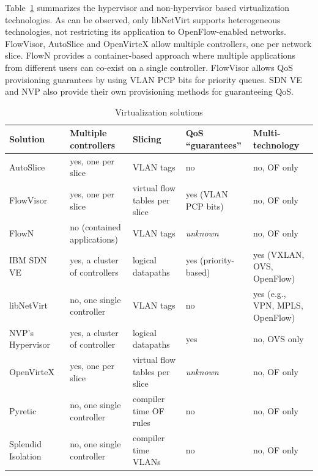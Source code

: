 Table~\ref{tab:virtualizationsolutions} summarizes the hypervisor and non-hypervisor based virtualization 
technologies. 
As can be observed, only libNetVirt supports heterogeneous technologies, not restricting its 
application to OpenFlow-enabled networks. FlowVisor, AutoSlice and OpenVirteX allow multiple controllers, 
one per network slice. FlowN provides a container-based approach where multiple applications from different 
users can co-exist on a single controller. FlowVisor allows QoS provisioning guarantees by using VLAN PCP bits for priority queues.
SDN VE and NVP also provide their own provisioning methods for guaranteeing QoS.

{\renewcommand{\arraystretch}{1.4}
\begin{table}[!htp]
\caption{Virtualization solutions}
\label{tab:virtualizationsolutions}
\begin{center}
\footnotesize
\begin{tabularx}{\textwidth}{p{3cm}p{3.1cm}p{3.1cm}p{2.6cm}X}
\hline
\textbf{Solution} & \textbf{Multiple controllers} & \textbf{Slicing} & \textbf{QoS ``guarantees''} & \textbf{Multi-technology} \\\hline
AutoSlice~\cite{bozakov2012} & yes, one per slice & VLAN tags & no & no, OF only\\\hline
FlowVisor~\cite{sherwood2009,azodolmolky2012} & yes, one per slice & virtual flow tables per slice &  yes (VLAN PCP bits) & no, OF only \\\hline
FlowN~\cite{drutskoy2012,drutskoy2013} & no (contained applications) & VLAN tags  & \textit{unknown} & no, OF only \\\hline
IBM SDN VE~\cite{racherla2014} & yes, a cluster of controllers & logical datapaths & yes (priority-based) & yes (VXLAN, OVS, OpenFlow) \\\hline
libNetVirt~\cite{turull2012} & no, one single controller & VLAN tags & no  & yes (e.g., VPN, MPLS, OpenFlow)\\\hline
NVP's Hypervisor~\cite{koponen} & yes, a cluster of controller & logical datapaths & yes & no, OVS only \\\hline
OpenVirteX~\cite{al-shabibi2014} & yes, one per slice & virtual flow tables per slice & \textit{unknown}  & no, OF only \\\hline 
Pyretic~\cite{reich2013} & no, one single controller & compiler time OF rules & no & no, OF only \\\hline
Splendid Isolation~\cite{gutz2012} & no, one single controller & compiler time VLANs & no  & no, OF only \\
\hline
\end{tabularx}
\end{center}
\end{table}
}



